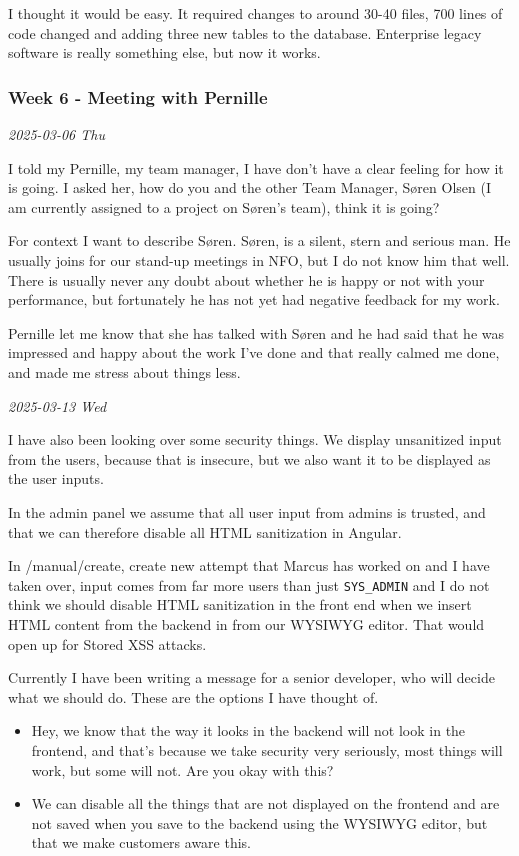 \documentclass[../main.tex]{subfiles}
\begin{document}
I thought it would be easy. It required changes to around 30-40 files, 700 lines of code changed and adding three new tables to the database. Enterprise legacy software is really something else, but now it works. 

\subsubsection{Week 6 - Meeting with Pernille}


\noindent \textit{2025-03-06 Thu}
\smallskip

I told my Pernille, my team manager, I have don't have a clear feeling for how it is going. I asked her, how do you and the other Team Manager, Søren Olsen (I am currently assigned to a project on Søren's team), think it is going?

For context I want to describe Søren. Søren, is a silent, stern and serious man. He usually joins for our stand-up meetings in NFO, but I do not know him that well. There is usually never any doubt about whether he is happy or not with your performance, but fortunately he has not yet had negative feedback for my work.

Pernille let me know that she has talked with Søren and he had said that he was impressed and happy about the work I've
done and that really calmed me done, and made me stress about things less.

\bigskip
\noindent \textit{2025-03-13 Wed}
\smallskip

I have also been looking over some security things. We display unsanitized input from the users, because that is insecure, but we also want it to be displayed as the user inputs.

In the admin panel we assume that all user input from admins is trusted, and that we can therefore disable all HTML sanitization in Angular.

In /manual/create, create new attempt that Marcus has worked on and I have taken over, input comes from far more users than just \verb|SYS_ADMIN| and I do not think we should disable HTML sanitization in the front end when we insert HTML content from the backend in from our WYSIWYG editor. That would open up for Stored XSS attacks.

Currently I have been writing a message for a senior developer, who will decide what we should do. These are the options I have thought of.

\begin{itemize}
    \item Hey, we know that the way it looks in the backend will not look in the frontend, and that's because we take security very seriously, most things will work, but some will not. Are you okay with this?
    \item We can disable all the things that are not displayed on the frontend and are not saved when you save to the backend using the WYSIWYG editor, but that we make customers aware this.
\end{itemize}
\end{document}
